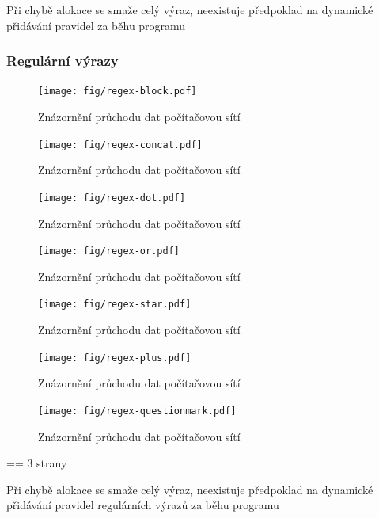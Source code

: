 Při chybě alokace se smaže celý výraz, neexistuje předpoklad na dynamické přidávání pravidel za běhu programu

\subsubsection{Regulární výrazy}

\begin{figure}[!htb]
	\centering
	\texttt{[image: fig/regex-block.pdf]}
	\caption{Znázornění průchodu dat počítačovou sítí}
	\label{fig:regex-block}
\end{figure}

\begin{figure}[!htb]
	\centering
	\texttt{[image: fig/regex-concat.pdf]}
	\caption{Znázornění průchodu dat počítačovou sítí}
	\label{fig:regex-concat}
\end{figure}

\begin{figure}[!htb]
	\centering
	\texttt{[image: fig/regex-dot.pdf]}
	\caption{Znázornění průchodu dat počítačovou sítí}
	\label{fig:regex-dot}
\end{figure}

\begin{figure}[!htb]
	\centering
	\texttt{[image: fig/regex-or.pdf]}
	\caption{Znázornění průchodu dat počítačovou sítí}
	\label{fig:regex-or}
\end{figure}

\begin{figure}[!htb]
	\centering
	\texttt{[image: fig/regex-star.pdf]}
	\caption{Znázornění průchodu dat počítačovou sítí}
	\label{fig:regex-star}
\end{figure}

\begin{figure}[!htb]
	\centering
	\texttt{[image: fig/regex-plus.pdf]}
	\caption{Znázornění průchodu dat počítačovou sítí}
	\label{fig:regex-plus}
\end{figure}

\begin{figure}[!htb]
	\centering
	\texttt{[image: fig/regex-questionmark.pdf]}
	\caption{Znázornění průchodu dat počítačovou sítí}
	\label{fig:regex-questionmark}
\end{figure}
== 3 strany

Při chybě alokace se smaže celý výraz, neexistuje předpoklad na dynamické přidávání pravidel
regulárních výrazů za běhu programu

